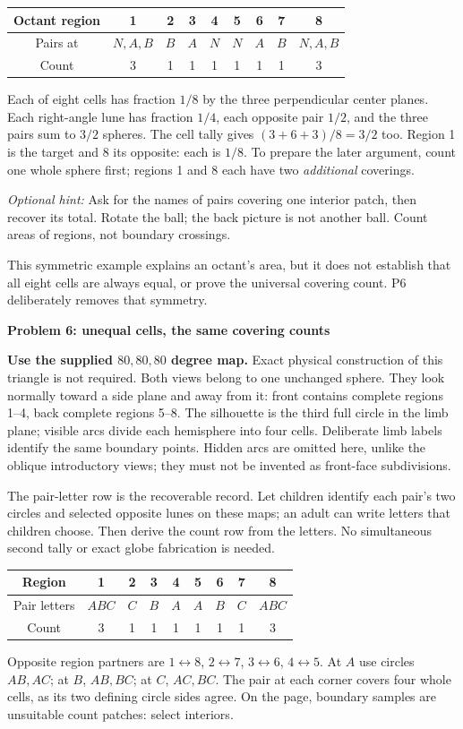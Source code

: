 \documentclass[11pt,letterpaper]{article}
\newcommand{\topic}[1]{\par{\large\bfseries\color{blue}#1}\par}
\newcommand{\hint}[1]{\textit{Optional hint:} #1\par}
\begin{document}
\begin{center}\begin{tabular}{c|cccccccc}
Octant region & 1&2&3&4&5&6&7&8\\\hline
Pairs at & $N,A,B$&$B$&$A$&$N$&$N$&$A$&$B$&$N,A,B$\\
Count &3&1&1&1&1&1&1&3
\end{tabular}\end{center}
Each of eight cells has fraction $1/8$ by the three perpendicular center planes. Each right-angle lune has fraction $1/4$, each opposite pair $1/2$, and the three pairs sum to $3/2$ spheres. The cell tally gives $(3+6+3)/8=3/2$ too. Region 1 is the target and 8 its opposite: each is $1/8$. To prepare the later argument, count one whole sphere first; regions 1 and 8 each have two \emph{additional} coverings.

\hint{Ask for the names of pairs covering one interior patch, then recover its total. Rotate the ball; the back picture is not another ball. Count areas of regions, not boundary crossings.}
This symmetric example explains an octant's area, but it does not establish that all eight cells are always equal, or prove the universal covering count. P6 deliberately removes that symmetry.

\newpage
\topic{Problem 6: unequal cells, the same covering counts}
\textbf{Use the supplied $80,80,80$ degree map.} Exact physical construction of this triangle is not required. Both views belong to one unchanged sphere. They look normally toward a side plane and away from it: front contains complete regions 1--4, back complete regions 5--8. The silhouette is the third full circle in the limb plane; visible arcs divide each hemisphere into four cells. Deliberate limb labels identify the same boundary points. Hidden arcs are omitted here, unlike the oblique introductory views; they must not be invented as front-face subdivisions.

The pair-letter row is the recoverable record. Let children identify each pair's two circles and selected opposite lunes on these maps; an adult can write letters that children choose. Then derive the count row from the letters. No simultaneous second tally or exact globe fabrication is needed.

\begin{center}\begin{tabular}{c|cccccccc}
Region &1&2&3&4&5&6&7&8\\\hline
Pair letters & $ABC$&$C$&$B$&$A$&$A$&$B$&$C$&$ABC$\\
Count &3&1&1&1&1&1&1&3
\end{tabular}\end{center}
Opposite region partners are $1\leftrightarrow8$, $2\leftrightarrow7$, $3\leftrightarrow6$, $4\leftrightarrow5$. At $A$ use circles $AB,AC$; at $B$, $AB,BC$; at $C$, $AC,BC$. The pair at each corner covers four whole cells, as its two defining circle sides agree. On the page, boundary samples are unsuitable count patches: select interiors.
\end{document}
